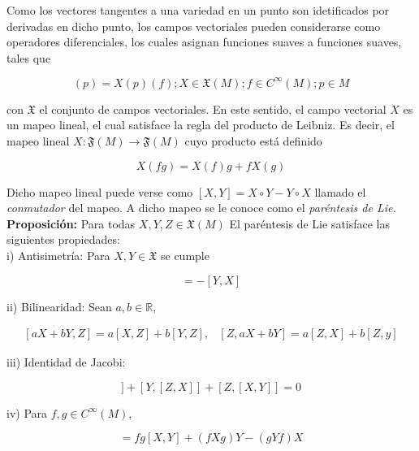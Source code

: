 \documentclass{report}
\begin{document}
{Como los vectores tangentes a una variedad en un punto son idetificados por derivadas en dicho punto, los campos vectoriales pueden considerarse como operadores diferenciales, los cuales asignan funciones suaves a funciones suaves, tales que

\begin{equation}
[X(f)](p) = X(p)(f); X \in  \mathfrak{X}(M); f \in C^{\infty}(M); p \in M
\end{equation}

con $\mathfrak{X}$ el conjunto de campos vectoriales. En este sentido, el campo vectorial $X$ es un mapeo lineal, el cual satisface la regla del producto de Leibniz. Es decir, el mapeo lineal $X: \mathfrak{F}(M) \to \mathfrak{F}(M)$ cuyo producto está definido

\begin{equation}
X(fg) = X(f)g + fX(g)
\end{equation}

Dicho mapeo lineal puede verse como $[X,Y] = X \circ Y - Y \circ X $ llamado el \textit{conmutador} del mapeo. A dicho mapeo se le conoce como el \textit{paréntesis de Lie.}\\

\textbf{Proposición:} Para todas $X, Y, Z \in \mathfrak{X}(M)$ El paréntesis de  Lie satisface las siguientes propiedades:\\

i) Antisimetría: Para $X, Y \in \mathfrak{X}$ se cumple

\begin{equation}
[X,Y] = -[Y,X]
\end{equation}

ii) Bilinearidad: Sean $a, b \in \mathbb{R}$, 

\begin{equation}
\begin{split}
[aX+bY,Z] = a[X,Z]+b[Y,Z],
& [Z, aX+bY] = a[Z,X]+b[Z,y]
\end{split}
\end{equation}


iii) Identidad de Jacobi: 

\begin{equation}
[X,[Y,Z]]+[Y,[Z,X]]+[Z,[X,Y]]=0
\end{equation}

iv) Para $f,g \in C^{\infty}(M)$,

\begin{equation}
[fX,gY]=fg[X,Y]+(fXg)Y-(gYf)X
\end{equation}  

}
\end{document}
